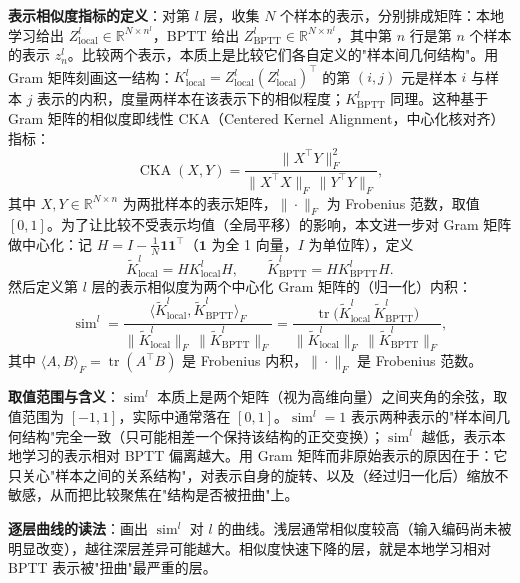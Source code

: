 \documentclass[journal,12pt,onecolumn]{IEEEtran}
\begin{document}
\textbf{表示相似度指标的定义}：对第 $l$ 层，收集 $N$ 个样本的表示，分别排成矩阵：本地学习给出 $Z^l_{\mathrm{local}}\in\mathbb R^{N\times n^l}$，BPTT 给出 $Z^l_{\mathrm{BPTT}}\in\mathbb R^{N\times n^l}$，其中第 $n$ 行是第 $n$ 个样本的表示 $z^l_n$。比较两个表示，本质上是比较它们各自定义的"样本间几何结构"。用 Gram 矩阵刻画这一结构：$K^l_{\mathrm{local}} = Z^l_{\mathrm{local}}(Z^l_{\mathrm{local}})^\top$ 的第 $(i,j)$ 元是样本 $i$ 与样本 $j$ 表示的内积，度量两样本在该表示下的相似程度；$K^l_{\mathrm{BPTT}}$ 同理。这种基于 Gram 矩阵的相似度即线性 CKA（Centered Kernel Alignment，中心化核对齐）指标：
\begin{equation}
\operatorname{CKA}(X, Y) = \frac{\|X^\top Y\|_F^2}{\|X^\top X\|_F \, \|Y^\top Y\|_F},
\end{equation}
其中 $X,Y\in\mathbb R^{N\times n}$ 为两批样本的表示矩阵，$\|\cdot\|_F$ 为 Frobenius 范数，取值 $[0,1]$。为了让比较不受表示均值（全局平移）的影响，本文进一步对 Gram 矩阵做中心化：记 $H = I - \frac{1}{N}\mathbf{1}\mathbf{1}^{\top}$（$\mathbf{1}$ 为全 1 向量，$I$ 为单位阵），定义
\begin{equation}
\tilde K^l_{\mathrm{local}} = H K^l_{\mathrm{local}} H,
\qquad
\tilde K^l_{\mathrm{BPTT}} = H K^l_{\mathrm{BPTT}} H.
\end{equation}
然后定义第 $l$ 层的表示相似度为两个中心化 Gram 矩阵的（归一化）内积：
\begin{equation}
\operatorname{sim}^l = \frac{\langle \tilde K^l_{\mathrm{local}}, \tilde K^l_{\mathrm{BPTT}}\rangle_F}{\|\tilde K^l_{\mathrm{local}}\|_F\,\|\tilde K^l_{\mathrm{BPTT}}\|_F}
= \frac{\operatorname{tr}\big(\tilde K^l_{\mathrm{local}}\,\tilde K^l_{\mathrm{BPTT}}\big)}{\|\tilde K^l_{\mathrm{local}}\|_F\,\|\tilde K^l_{\mathrm{BPTT}}\|_F},
\end{equation}
其中 $\langle A,B\rangle_F=\operatorname{tr}(A^\top B)$ 是 Frobenius 内积，$\|\cdot\|_F$ 是 Frobenius 范数。

\textbf{取值范围与含义}：$\operatorname{sim}^l$ 本质上是两个矩阵（视为高维向量）之间夹角的余弦，取值范围为 $[-1,1]$，实际中通常落在 $[0,1]$。$\operatorname{sim}^l=1$ 表示两种表示的"样本间几何结构"完全一致（只可能相差一个保持该结构的正交变换）；$\operatorname{sim}^l$ 越低，表示本地学习的表示相对 BPTT 偏离越大。用 Gram 矩阵而非原始表示的原因在于：它只关心"样本之间的关系结构"，对表示自身的旋转、以及（经过归一化后）缩放不敏感，从而把比较聚焦在"结构是否被扭曲"上。

\textbf{逐层曲线的读法}：画出 $\operatorname{sim}^l$ 对 $l$ 的曲线。浅层通常相似度较高（输入编码尚未被明显改变），越往深层差异可能越大。相似度快速下降的层，就是本地学习相对 BPTT 表示被"扭曲"最严重的层。
\end{document}
